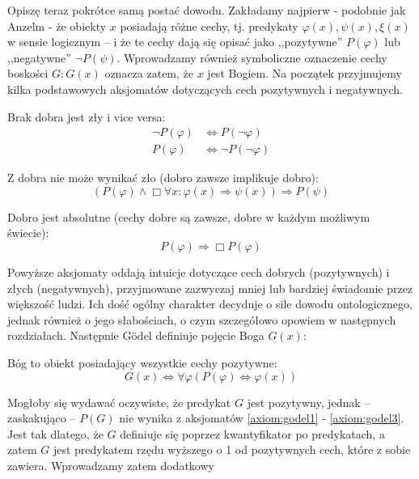 \documentclass[12pt]{article}
\begin{document}
\begin{multicols}{2}
Opiszę teraz pokrótce samą postać dowodu. Zakładamy najpierw - podobnie jak Anzelm - że obiekty $x$ posiadają różne cechy, tj. predykaty $\varphi(x), \psi(x), \xi(x)$ w sensie logicznym -- i że te cechy dają się opisać jako ,,pozytywne'' $P(\varphi)$ lub ,,negatywne'' $\neg P(\psi)$. Wprowadzamy również symboliczne oznaczenie cechy boskości $G: G(x)$ oznacza zatem, że $x$ jest Bogiem. Na początek przyjmujemy kilka podstawowych aksjomatów dotyczących cech pozytywnych i negatywnych. 
\begin{axiom-g} \label{axiom:godel1}
	Brak dobra jest zły i vice versa: 
	\begin{align*}
	\neg P(\varphi) & \Leftrightarrow P(\neg \varphi) \\ 
	P(\varphi) & \Leftrightarrow \neg P( \neg \varphi )
	\end{align*}
\end{axiom-g}
\begin{axiom-g} \label{axiom:godel2}
	Z dobra nie może wynikać zło (dobro zawsze implikuje dobro): 
	\begin{equation*}
	\left( P(\varphi) \wedge \Box \forall x: \varphi(x) \Rightarrow \psi(x) \right) \Rightarrow P(\psi)
	\end{equation*}
\end{axiom-g}
\begin{axiom-g} \label{axiom:godel3}
	Dobro jest absolutne (cechy dobre są zawsze, dobre w każdym możliwym świecie):
	\begin{equation*}
	P(\varphi) \Rightarrow \Box P(\varphi)
	\end{equation*}
\end{axiom-g}
Powyższe aksjomaty oddają intuicje dotyczące cech dobrych (pozytywnych) i złych (negatywnych), przyjmowane zazwyczaj mniej lub bardziej świadomie przez większość ludzi. Ich dość ogólny charakter decyduje o sile dowodu ontologicznego, jednak również o jego słabościach, o czym szczegółowo opowiem w następnych rozdziałach. 
Następnie Gödel definiuje pojęcie Boga $G(x)$:
\begin{definition-g} \label{def:godel1}
	Bóg to obiekt posiadający wszystkie cechy pozytywne: 
	\begin{equation*}
	G(x) \Leftrightarrow \forall \varphi \left( P(\varphi) \Leftrightarrow \varphi(x) \right)
	\end{equation*}
\end{definition-g}
Mogłoby się wydawać oczywiste, że predykat $G$ jest pozytywny, jednak -- zaskakująco -- $P(G)$ nie wynika z aksjomatów \ref{axiom:godel1} - \ref{axiom:godel3}. Jest tak dlatego, że $G$ definiuje się poprzez kwantyfikator po predykatach, a zatem $G$ jest predykatem rzędu wyższego o 1 od pozytywnych cech, które z sobie zawiera. Wprowadzamy zatem dodatkowy

\end{multicols}
\end{document}

